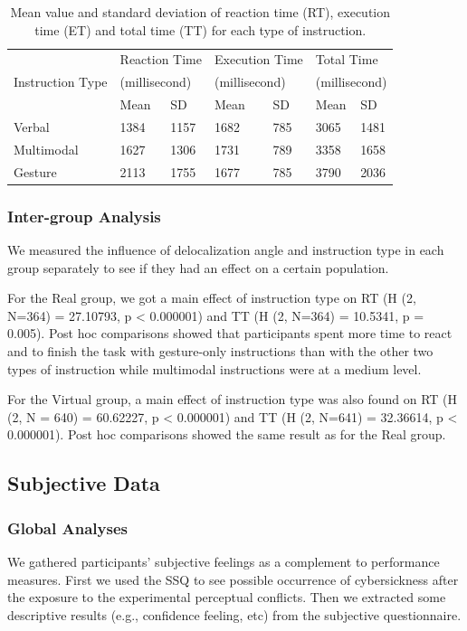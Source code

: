 \begin{table}[htb]
\renewcommand{\arraystretch}{1.3}
\caption{Mean value and standard deviation of reaction time (RT), execution time (ET) and total time (TT) for each type of instruction.}
\label{tab:3_metrics}
\centering
\begin{tabular}{l l l l l l l}
  \hline
    & \multicolumn{2}{p{3cm}}{Reaction Time} & \multicolumn{2}{p{3cm}}{Execution Time} & \multicolumn{2}{p{3cm}}{Total Time} \\
    Instruction Type & \multicolumn{2}{p{3cm}}{(millisecond)} & \multicolumn{2}{p{3cm}}{(millisecond)} & \multicolumn{2}{p{3cm}}{(millisecond)} \\
    \hline
    & Mean & SD & Mean & SD & Mean & SD \\
    Verbal & 1384 & 1157 & 1682 & 785 & 3065 & 1481 \\
  Multimodal & 1627 & 1306 & 1731 & 789 & 3358 & 1658 \\
  Gesture & 2113 & 1755 & 1677 & 785 & 3790 & 2036 \\ \hline
\end{tabular}
\end{table}

\subsubsection{Inter-group Analysis}
We measured the influence of delocalization angle and instruction type in each group separately to see if they had an effect on a certain population.

For the Real group, we got a main effect of instruction type on RT (H (2, N=364) = 27.10793, p \textless{} 0.000001) and TT (H (2, N=364) = 10.5341, p = 0.005). Post hoc comparisons showed that participants spent more time to react and to finish the task with gesture-only instructions than with the other two types of instruction while multimodal instructions were at a medium level.

For the Virtual group, a main effect of instruction type was also found on RT (H (2, N = 640) = 60.62227, p \textless{} 0.000001) and TT (H (2, N=641) = 32.36614, p \textless{} 0.000001). Post hoc comparisons showed the same result as for the Real group.

\subsection{Subjective Data}
\subsubsection{Global Analyses}
We gathered participants' subjective feelings as a complement to performance measures. First we used the SSQ to see possible occurrence of cybersickness after the exposure to the experimental perceptual conflicts. Then we extracted some descriptive results (e.g., confidence feeling, etc) from the subjective questionnaire.

